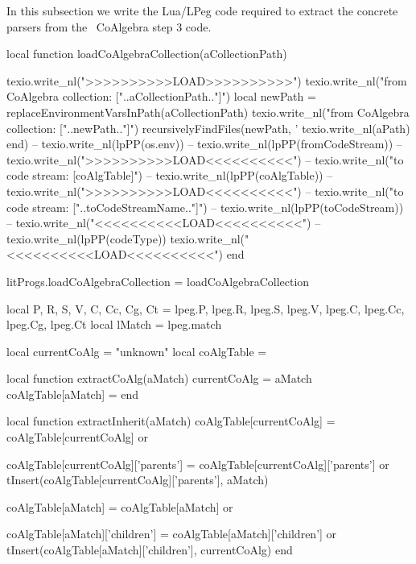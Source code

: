 In this subsection we write the Lua/LPeg code required to extract the 
concrete parsers from the \joylol\ CoAlgebra step 3 code.

\startMkIVCode
\def\loadCoAlgebraCollection#1{
  \directlua{
    thirddata.literateProgs.loadCoAlgebraCollection('#1')
  }
}

\def\extractConcreteParserFromTo#1#2{
  \directlua{
    thirddata.literateProgs.extractConcreteParserFromTo('#1', '#2')
  }
}
\stopMkIVCode

\startLuaCode

local function loadCoAlgebraCollection(aCollectionPath)

  texio.write_nl(">>>>>>>>>>LOAD>>>>>>>>>>")
  texio.write_nl("from CoAlgebra collection: ["..aCollectionPath.."]")
  local newPath = replaceEnvironmentVarsInPath(aCollectionPath)
  texio.write_nl("from CoAlgebra collection: ["..newPath.."]")
  recursivelyFindFiles(newPath, '%
    texio.write_nl(aPath)
  end)
--  texio.write_nl(lpPP(os.env))
--  texio.write_nl(lpPP(fromCodeStream))
--  texio.write_nl(">>>>>>>>>>LOAD<<<<<<<<<<")
--  texio.write_nl("to code stream: [coAlgTable]")
--  texio.write_nl(lpPP(coAlgTable))
--  texio.write_nl(">>>>>>>>>>LOAD<<<<<<<<<<")
--  texio.write_nl("to code stream: ["..toCodeStreamName.."]")
--  texio.write_nl(lpPP(toCodeStream))  
--  texio.write_nl("<<<<<<<<<<LOAD<<<<<<<<<<\n")
--  texio.write_nl(lpPP(codeType))
  texio.write_nl("<<<<<<<<<<LOAD<<<<<<<<<<\n")
end

litProgs.loadCoAlgebraCollection = loadCoAlgebraCollection
\stopLuaCode

\startLuaCode
local P, R, S, V, C, Cc, Cg, Ct = 
  lpeg.P, lpeg.R, lpeg.S, lpeg.V, lpeg.C, lpeg.Cc, lpeg.Cg, lpeg.Ct
local lMatch = lpeg.match

local currentCoAlg = "unknown"
local coAlgTable   = {}

local function extractCoAlg(aMatch)
  currentCoAlg       = aMatch
  coAlgTable[aMatch] = {}
end

local function extractInherit(aMatch)
  coAlgTable[currentCoAlg] = coAlgTable[currentCoAlg] or {}
  
  coAlgTable[currentCoAlg]['parents'] = 
    coAlgTable[currentCoAlg]['parents'] or {}
  tInsert(coAlgTable[currentCoAlg]['parents'], aMatch)  
  
  coAlgTable[aMatch] = coAlgTable[aMatch] or { }
  
  coAlgTable[aMatch]['children'] = 
    coAlgTable[aMatch]['children'] or {}
  tInsert(coAlgTable[aMatch]['children'], currentCoAlg)
end

